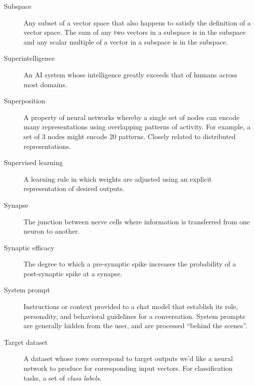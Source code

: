 \begin{description}

\item[Subspace] Any subset of a vector space that also happens to satisfy the definition of a vector space. The sum of any two vectors in a subspace is in the subspace and any scalar multiple of a vector in a subspace is in the subspace.

\item[Superintelligence] An AI system whose intelligence greatly exceeds that of humans across most domains.


\item[Superposition] A property of neural networks whereby a single set of nodes can encode many representations using overlapping patterns of activity.  For example, a set of 3 nodes might encode 20 patterns. Closely related to distributed representations. 


\item[Supervised learning] A learning rule in which weights are adjusted using an explicit representation of desired outputs.

\item[Synapse] The junction between nerve cells where information is transferred from one neuron to another.

\item[Synaptic efficacy] The degree to which a pre-synaptic spike increases the probability of a post-synaptic spike at a synapse.

\item[System prompt] Instructions or context provided to a chat model that establish its role, personality, and behavioral guidelines for a conversation. System prompts are generally hidden from the user, and are processed ``behind the scenes''.

\item[Target dataset] A dataset whose rows correspond to target outputs we'd like a neural network to produce for corresponding input vectors. For classification tasks, a set of \emph{class labels}.



\end{description}
